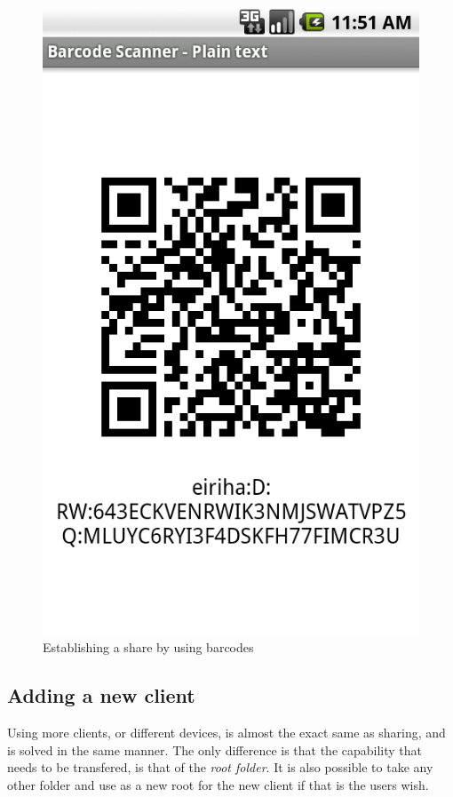 \documentclass[pdftex,english,10pt,b5paper,twoside]{book}
\begin{document}
\begin{figure}[h!]
    \centering
    \includegraphics[scale=0.4]{client-barcode.png}
    \caption{Establishing a share by using barcodes}
    \label{fig:csvandroid:barcode}
\end{figure}

\subsection{Adding a new client}

Using more clients, or different devices, is almost the exact same as sharing,
and is solved in the same manner. The only difference is that the capability
that needs to be transfered, is that of the \emph{root folder}. It is also
possible to take any other folder and use as a new root for the new client if
that is the users wish.
\end{document}
